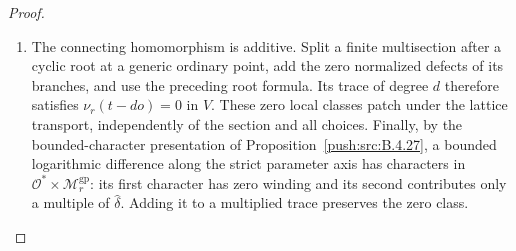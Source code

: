 \begin{proof}
\begin{enumerate}[label=\arabic*.,leftmargin=*]
\item The connecting homomorphism is additive. Split a finite multisection after a cyclic root at a generic ordinary point, add the zero normalized defects of its branches, and use the preceding root formula. Its trace of degree $d$ therefore satisfies $\nu_r(t-do)=0$ in $V$. These zero local classes patch under the lattice transport, independently of the section and all choices. Finally, by the bounded-character presentation of Proposition~\ref{push:src:B.4.27}, a bounded logarithmic difference along the strict parameter axis has characters in $\mathcal O^*\times\mathcal M_r^{\mathrm{gp}}$: its first character has zero winding and its second contributes only a multiple of $\widehat\delta$. Adding it to a multiplied trace preserves the zero class.
\end{enumerate}
\end{proof}
